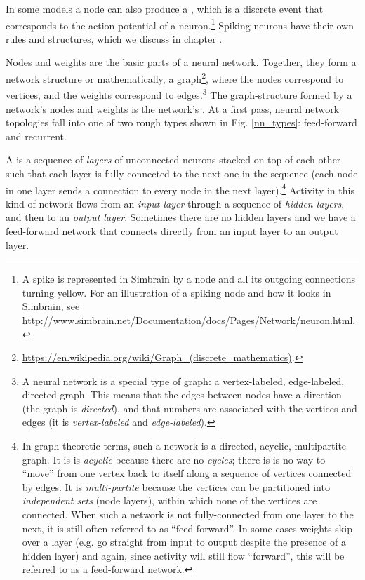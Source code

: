 In some models a node can also produce a , which is a discrete event that corresponds to the action potential of a neuron.\footnote{A spike is represented in Simbrain by a node and all its outgoing connections turning yellow. For an illustration of a spiking node and how it looks in Simbrain, see \url{http://www.simbrain.net/Documentation/docs/Pages/Network/neuron.html}.}  Spiking neurons have their own rules and structures, which we discuss in chapter .

Nodes and weights are the basic parts of a neural network. Together, they form a network structure or mathematically, a graph\footnote{\url{https://en.wikipedia.org/wiki/Graph_(discrete_mathematics)}.}, where the nodes correspond to vertices, and the weights correspond to edges.\footnote{A neural network is a special type of graph: a vertex-labeled, edge-labeled, directed graph. This means that the edges between nodes have a direction (the graph is \emph{directed}), and that numbers are associated with the vertices and edges (it is \emph{vertex-labeled} and \emph{edge-labeled}).}  The graph-structure formed by a network's nodes and weights is the network's . At a first pass, neural network topologies fall into one of two rough types shown in Fig. \ref{nn_types}: feed-forward and recurrent. 

A   is a sequence of \emph{layers} of unconnected neurons stacked on top of each other such that each layer is fully connected to the next one in the sequence (each node in one layer sends a connection to every node in the next layer).\footnote{\label{acyclic} In graph-theoretic terms, such a network is a directed, acyclic, multipartite graph. It is is \emph{acyclic} because there are no \emph{cycles}; there is is no way to ``move'' from one vertex back to itself along a sequence of vertices connected by edges. It is \emph{multi-partite} because the vertices can be partitioned into \emph{independent sets} (node layers), within which none of the vertices are connected. When such a network is not fully-connected from one layer to the next, it is still often referred to as ``feed-forward''. In some cases weights skip over a layer (e.g. go straight from input to output despite the presence of a hidden layer) and again, since activity will still flow ``forward'', this will be referred to as a feed-forward network.}  Activity in this kind of network flows from an \emph{input layer} through a sequence of \emph{hidden layers}, and then to an \emph{output layer}. Sometimes there are no hidden layers and we have a feed-forward network that connects directly from an input layer to an output layer.


